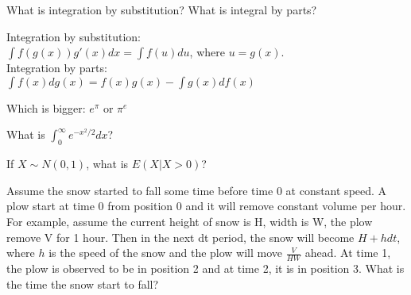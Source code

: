\begin{exe}
What is integration by substitution? What is integral by parts?
\end{exe}
\begin{teacher}
\begin{sol}
Integration by substitution:\\
$\int f(g(x)) g'(x) dx = \int f(u) du$, where $u=g(x)$.\\
Integration by parts:\\
$\int f(x) dg(x) = f(x) g(x) - \int g(x) df(x)$
\end{sol}
\end{teacher}

\begin{exe}
Which is bigger: $e^\pi$ or $\pi^e$
\end{exe}
\begin{teacher}
\begin{sol}
\end{sol}
\end{teacher}

\begin{exe}
What is $\int_0^{\infty} e^{-x^2/2} dx$?
\end{exe}
\begin{teacher}
\begin{sol}
\end{sol}
\end{teacher}

\begin{exe}
If $X\sim N(0,1)$, what is $E(X|X>0)$?
\end{exe}
\begin{teacher}
\begin{sol}
\end{sol}
\end{teacher}

\begin{exe}
Assume the snow started to fall some time before time 0 at constant speed. A plow start at time 0 from position 0 and it will remove constant volume per hour. For example, assume the current height of snow is H, width is W, the plow remove V for 1 hour. Then in the next dt period, the snow will become $H+hdt$, where $h$ is the speed of the snow and the plow will move $\frac{V}{HW}$ ahead. At time 1, the plow is observed to be in position 2 and at time 2, it is in position 3. What is the time the snow start to fall?
\end{exe}
\begin{teacher}
\begin{sol}
\end{sol}
\end{teacher}

